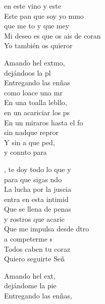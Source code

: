 \documentclass[12pt]{article}
\begin{document}
\begin{multicols*}{2}
\begin{cancion}
	en este vino y este \\
	Este pan que soy yo mmo \\
	que me to y que mey\\
	Mi deseo es que os ais de coran \\
	Yo también os quieror\\
	\begin{chorus}%
	Amando hel extmo, \\
	dejándoos la pl\\
	Entregando las enñas \\
	como loace una mr\\
	En una toalla lebllo, \\
	en un acariciar los ps\\
	En un miraros hasta el fo \\
	sin nadque repror\\
	Y sin a que ped, \\
	y connto para \\
	\end{chorus}%
	, te doy todo lo que y \\
	para que sigas ndo\\
	La lucha por la juscia \\
	entra en esta intimid\\
	Que se llena de penas \\
	y rostros que acaric\\
	Que me impulsa desde dtro \\
	a competerme s\\
	Todos caben  tu coraz\\
	Quiero seguirte Señ\\
	\begin{chorus}%
	Amando hel ext, \\
	dejándome la pie\\
	Entregando las enñas, \\

\end{chorus}
\end{cancion}
\end{multicols*}
\end{document}
